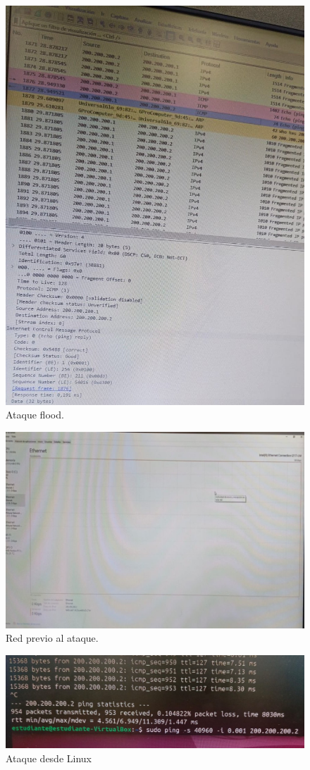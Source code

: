 \begin{figure}[H]
    \centering
    \includegraphics[width=0.75\columnwidth]{punto2/images/2_ping_ataque_flood.jpeg}
    \caption{Ataque flood.}
\end{figure}
\begin{figure}[H]
    \centering
    \includegraphics[width=\columnwidth]{punto2/images/3_red_previa.jpeg}
    \caption{Red previo al ataque.}
\end{figure}
\begin{figure}[H]
    \centering
    \includegraphics[width=\columnwidth]{punto2/images/4_linux_ataque.jpeg}
    \caption{Ataque desde Linux}
\end{figure}
